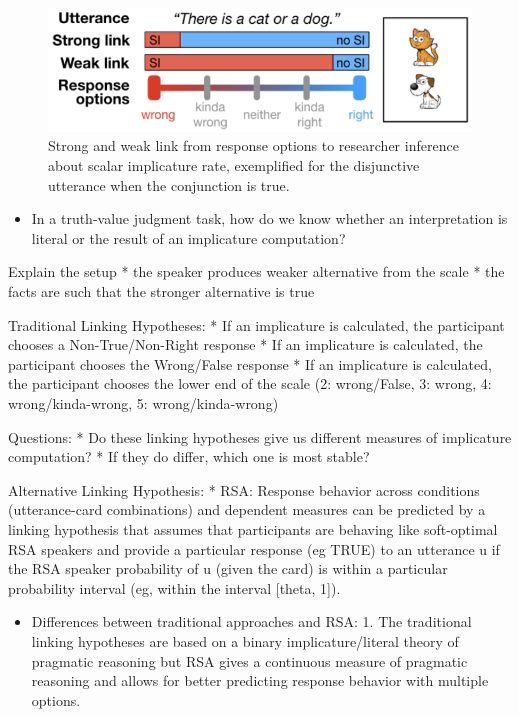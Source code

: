 \documentclass[floatsintext,man]{apa6}
\providecommand{\tightlist}{%
  \setlength{\itemsep}{0pt}\setlength{\parskip}{0pt}}
\theoremstyle{definition}
\theoremstyle{definition}
\theoremstyle{definition}
\theoremstyle{remark}
\begin{document}
\begin{figure}

{\centering \includegraphics{writeup_files/figure-latex/linkvisualization-1} 

}

\caption{Strong and weak link from response options to researcher inference about scalar implicature rate, exemplified for the disjunctive utterance when the conjunction is true.}\label{fig:linkvisualization}
\end{figure}

\begin{itemize}
\tightlist
\item
  In a truth-value judgment task, how do we know whether an
  interpretation is literal or the result of an implicature computation?
\end{itemize}

Explain the setup * the speaker produces weaker alternative from the
scale * the facts are such that the stronger alternative is true

Traditional Linking Hypotheses: * If an implicature is calculated, the
participant chooses a Non-True/Non-Right response * If an implicature is
calculated, the participant chooses the Wrong/False response * If an
implicature is calculated, the participant chooses the lower end of the
scale (2: wrong/False, 3: wrong, 4: wrong/kinda-wrong, 5:
wrong/kinda-wrong)

Questions: * Do these linking hypotheses give us different measures of
implicature computation? * If they do differ, which one is most stable?

Alternative Linking Hypothesis: * RSA: Response behavior across
conditions (utterance-card combinations) and dependent measures can be
predicted by a linking hypothesis that assumes that participants are
behaving like soft-optimal RSA speakers and provide a particular
response (eg TRUE) to an utterance u if the RSA speaker probability of u
(given the card) is within a particular probability interval (eg, within
the interval {[}theta, 1{]}).

\begin{itemize}
\tightlist
\item
  Differences between traditional approaches and RSA: 1. The traditional
  linking hypotheses are based on a binary implicature/literal theory of
  pragmatic reasoning but RSA gives a continuous measure of pragmatic
  reasoning and allows for better predicting response behavior with
  multiple options.
\end{itemize}
\end{document}
